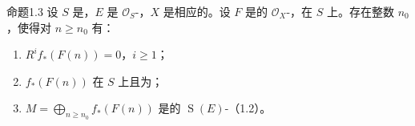 \begin{SGAresult}{命题}{1.3}
设 $S$ 是，$E$ 是 $\mathcal O_S$-，$X$ 是相应的。设 $F$ 是的 $\mathcal O_X$-，在 $S$ 上。存在整数 $n_0$，使得对 $n\geq n_0$ 有：
\begin{enumerate}
\item[i)] $R^if_*(F(n))=0$，$i\geq1$；
\item[ii)] $f_*(F(n))$ 在 $S$ 上且为；
\item[iii)] $M=\bigoplus_{n\geq n_0}f_*(F(n))$ 是的 $\operatorname{S}(E)$-（1.2）。
\end{enumerate}
\end{SGAresult}
